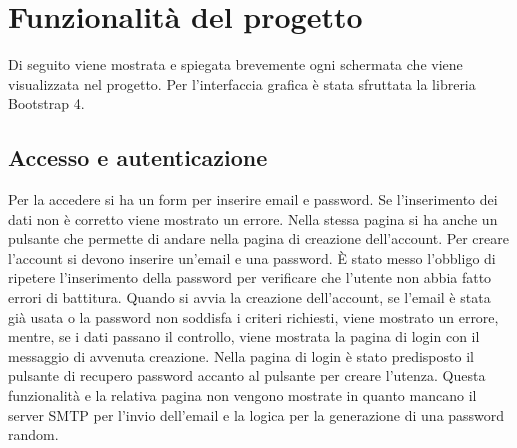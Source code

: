 \section{Funzionalità del progetto}
\label{sec:flask-funzionalità}
Di seguito viene mostrata e spiegata brevemente ogni schermata che viene visualizzata nel progetto.
Per l'interfaccia grafica è stata sfruttata la libreria Bootstrap 4.

\subsection{Accesso e autenticazione}
\label{secsub:flask-funzionalità-accesso}
Per la accedere si ha un form per inserire email e password.
Se l'inserimento dei dati non è corretto viene mostrato un errore.
Nella stessa pagina si ha anche un pulsante che permette di andare nella pagina di creazione dell'account.
Per creare l'account si devono inserire un'email e una password. 
È stato messo l'obbligo di ripetere l'inserimento della password per verificare che l'utente non abbia fatto errori di battitura.
Quando si avvia la creazione dell'account, se l'email è stata già usata o la password non soddisfa i criteri richiesti, viene
mostrato un errore, mentre, se i dati passano il controllo, viene mostrata la pagina di login con il messaggio di avvenuta creazione.
Nella pagina di login è stato predisposto il pulsante di recupero password accanto al pulsante per creare l'utenza.
Questa funzionalità e la relativa pagina non vengono mostrate in quanto mancano il server SMTP per l'invio dell'email
e la logica per la generazione di una password random.
